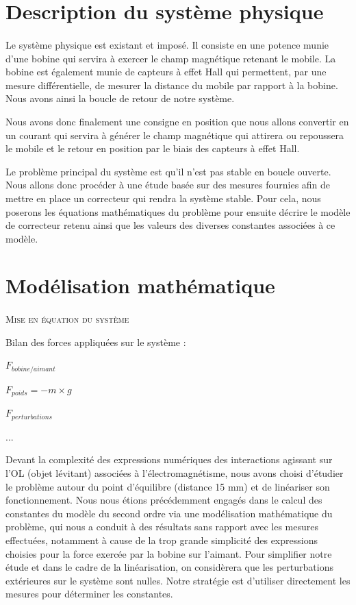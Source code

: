 \documentclass[11pt, french]{article} %
\begin{document}
\section{Description du système physique}
\paragraph{}

Le système physique est existant et imposé. Il consiste en une potence munie d'une bobine qui servira à exercer le champ magnétique retenant le mobile. La bobine est également munie de capteurs à effet Hall qui permettent, par une mesure différentielle, de mesurer la distance du mobile par rapport à la bobine. Nous avons ainsi la boucle de retour de notre système. 

Nous avons donc finalement une consigne en position que nous allons convertir en un courant qui servira à générer le champ magnétique qui attirera ou repoussera le mobile et le retour en position par le biais des capteurs à effet Hall. 

Le problème principal du système est qu'il n'est pas stable en boucle ouverte. Nous allons donc procéder à une étude basée sur des mesures fournies afin de mettre en place un correcteur qui rendra la système stable. Pour cela, nous poserons les équations mathématiques du problème pour ensuite décrire le modèle de correcteur retenu ainsi que les valeurs des diverses constantes associées à ce modèle.

\section{Modélisation mathématique}

\paragraph{}
\textsc{Mise en équation du système}

\noindent
Bilan des forces appliquées sur le système :

\smallskip
$ F_{bobine/aimant}  $

$ F_{poids} = -m \times g $

$ F_{perturbations} $

...

\medskip

Devant la complexité des expressions numériques des interactions agissant sur l'OL (objet lévitant) associées à l'électromagnétisme, nous avons choisi d'étudier le problème autour du point d'équilibre (distance 15 mm) et de linéariser son fonctionnement. Nous nous étions précédemment engagés dans le calcul des constantes du modèle du second ordre via une modélisation mathématique du problème, qui nous a conduit à des résultats sans rapport avec les mesures effectuées, notamment à cause de la trop grande simplicité des expressions choisies pour la force exercée par la bobine sur l'aimant. Pour simplifier notre étude et dans le cadre de la linéarisation, on considèrera que les perturbations extérieures sur le système sont nulles. Notre stratégie est d'utiliser directement les mesures pour déterminer les constantes.
\end{document}
